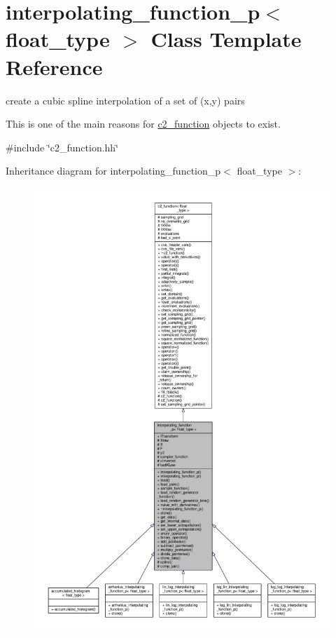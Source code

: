 \hypertarget{classinterpolating__function__p}{}\section{interpolating\+\_\+function\+\_\+p$<$ float\+\_\+type $>$ Class Template Reference}
\label{classinterpolating__function__p}


create a cubic spline interpolation of a set of (x,y) pairs

This is one of the main reasons for \hyperlink{classc2__function}{c2\+\_\+function} objects to exist.  




{\ttfamily \#include \char`\"{}c2\+\_\+function.\+hh\char`\"{}}



Inheritance diagram for interpolating\+\_\+function\+\_\+p$<$ float\+\_\+type $>$\+:
\nopagebreak
\begin{figure}[H]
\begin{center}
\leavevmode
\includegraphics[width=350pt]{classinterpolating__function__p__inherit__graph}
\end{center}
\end{figure}


